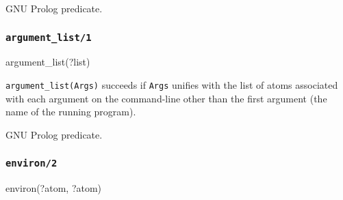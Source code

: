 \begin{PlErrors}





\end{PlErrors}

\Portability

GNU Prolog predicate.

\subsubsection{\texttt{argument\_list/1}}
\label{argument-list/1}

\begin{TemplatesOneCol}
argument\_list(?list)

\end{TemplatesOneCol}

\Description

\texttt{argument\_list(Args)} succeeds if \texttt{Args} unifies with the
list of atoms associated with each argument on the command-line other than the
first argument (the name of the running program).

\begin{PlErrors}


\end{PlErrors}

\Portability

GNU Prolog predicate.

\subsubsection{\texttt{environ/2}}

\begin{TemplatesOneCol}
environ(?atom, ?atom)

\end{TemplatesOneCol}

\Description

